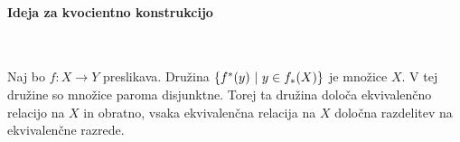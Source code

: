 \paragraph{Ideja za kvocientno konstrukcijo} \ 

Naj bo \(f: X \to Y\) preslikava. Družina \(\left\{f^{*}(y) \ | \ y \in f_{*}(X)\right\}\) je  množice \(X\). V tej družine so množice paroma disjunktne. Torej ta družina določa ekvivalenčno relacijo na \(X\) in obratno, vsaka ekvivalenčna relacija na \(X\) določna razdelitev na ekvivalenčne razrede.  
